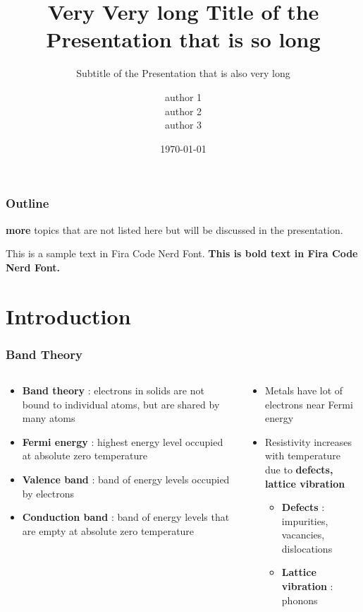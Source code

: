 \documentclass{beamer}
\title{Very Very long	Title of the Presentation that is so long}
\subtitle{Subtitle of the Presentation that is also very long}
\author{ author 1 \\ author 2 \\ author 3 \\ \vspace{0.5cm}}
\institute{Sample  University  \\ \vspace{1cm}
}
\date{\today}
\begin{document}
\begin{frame}[plain]
	\titlepage
\end{frame}

\begin{frame}
	\frametitle{Outline}
	\begin{tcolorbox}[colback=red!5!white,colframe=red!35!black,sharp corners=northwest ]
		\textbf{more} topics that are not listed here but will be discussed in the presentation.
	\end{tcolorbox}
\end{frame}


\textsf{This is a sample text in Fira Code Nerd Font.}
\textsf{\textbf{This is bold text in Fira Code Nerd Font.}}


\section{Introduction}


\begin{frame}
	\frametitle{Band Theory}
	\begin{columns}
		\begin{column}{0.5\textwidth}
			\begin{itemize}
				\item \textbf{Band theory} : electrons in solids are not bound to individual atoms, but are shared by many atoms
				\item \textbf{Fermi energy} : highest energy level occupied at absolute zero temperature
				\item \textbf{Valence band} : band of energy levels occupied by electrons
				\item \textbf{Conduction band} : band of energy levels that are empty at absolute zero temperature
			\end{itemize}
		\end{column}
		\begin{column}{0.5\textwidth}
			\begin{itemize}
				\item Metals have lot of electrons near Fermi energy
				\item Resistivity increases with temperature \\
				      due to \textbf{defects, lattice vibration }
				\begin{itemize}
					\item \textbf{Defects} : impurities, vacancies, dislocations
					\item \textbf{Lattice vibration} : phonons
				\end{itemize}
			\end{itemize}
		\end{column}
	\end{columns}
\end{frame}
\end{document}
